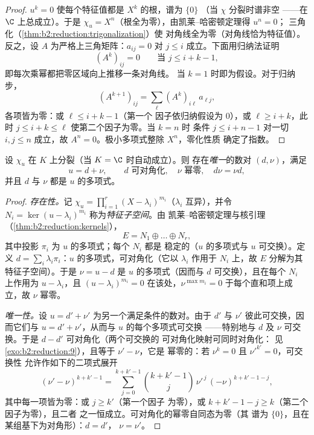 \begin{proof}
$u^k = 0$ 使每个特征值都是 $X^k$ 的根，谱为 $\{0\}$
（当 $\chi$ 分裂时谱非空 ——在 $\C$ 上总成立）。于是 $\chi_u =
X^n$（根全为零），由凯莱–哈密顿定理得 $u^n = 0$；
三角化（\cref{thm:b2:reduction:trigonalization}）使
对角线全为零（对角线恰为特征值）。
反之，设 $A$ 为严格上三角矩阵：$a_{ij} = 0$
对 $j \leq i$ 成立。下面用归纳法证明
\[
(A^k)_{ij} = 0 \qquad \text{当 } j \leq i + k - 1,
\]
即每次乘幂都把零区域向上推移一条对角线。
当 $k = 1$ 时即为假设。对于归纳步，
\[
(A^{k+1})_{ij} = \sum_{\ell} (A^k)_{i\ell}\,a_{\ell j} ,
\]
各项皆为零：或 $\ell \leq i + k - 1$（第一个
因子依归纳假设为 $0$），或 $\ell \geq i + k$，此时
$j \leq i + k \leq \ell$ 使第二个因子为零。当 $k = n$ 时
条件 $j \leq i + n - 1$ 对一切 $i, j \leq n$ 成立，故 $A^n =
0$。极小多项式整除 $X^n$，零化性质
确定了指数。
\end{proof}

\begin{theorem}[邓福德分解]\label{thm:b2:reduction:dunford}
设 $\chi_u$ 在 $K$ 上分裂（当 $K = \C$ 时自动成立）。则
存在\emph{唯一}的数对 $(d, \nu)$，满足
\[
u = d + \nu, \qquad d \text{ 可对角化}, \quad \nu
\text{ 幂零}, \quad d\nu = \nu d ,
\]
并且 $d$ 与 $\nu$ 都是
$u$ 的多项式。
\end{theorem}

\begin{proof}
\emph{存在性。}记 $\chi_u = \prod_{i=1}^{r} (X -
\lambda_i)^{m_i}$（$\lambda_i$ 互异），并令 $N_i = \ker(u -
\lambda_i)^{m_i}$ 称为\emph{特征子空间}。由
凯莱–哈密顿定理与核引理
（\cref{thm:b2:reduction:kernels}），
\[
E = N_1 \oplus \dots \oplus N_r ,
\]
其中投影 $\pi_i$ 为 $u$ 的多项式；每个 $N_i$ 都是
稳定的（$u$ 的多项式与 $u$ 可交换）。定义 $d = \sum_i \lambda_i
\pi_i$：$u$ 的多项式，可对角化（它以 $\lambda_i$
作用于 $N_i$ 上，故 $E$ 分解为其特征子空间）。于是 $\nu = u -
d$ 是 $u$ 的多项式（因而与 $d$ 可交换），且在每个
$N_i$ 上作用为 $u - \lambda_i$，且 $(u - \lambda_i)^{m_i} = 0$
在该处，$\nu^{\max m_i} = 0$ 于每个直和项上成立，故 $\nu$ 幂零。

\emph{唯一性。}设 $u = d' + \nu'$ 为另一个满足条件的数对。由于
$d'$ 与 $\nu'$ 彼此可交换，因而它们与 $u = d' +
\nu'$，从而与 $u$ 的每个多项式可交换 ——特别地与 $d$
及 $\nu$ 可交换。于是 $d - d'$ 可对角化（两个可交换的
可对角化映射可同时对角化：
见\cref{exo:b2:reduction:9}），且等于 $\nu' - \nu$，它是
幂零的：若 $\nu^k = 0$ 且 $\nu'^{k'} = 0$，可交换性
允许作如下的二项式展开
\[
(\nu' - \nu)^{k + k' - 1}
= \sum_{j=0}^{k+k'-1}\binom{k + k' - 1}{j}
\,\nu'^{\,j}\,(-\nu)^{k + k' - 1 - j} ,
\]
其中每一项皆为零：或 $j \geq k'$（第一个因子
为零），或 $k + k' - 1 - j \geq k$（第二个因子为零），且二者
之一恒成立。可对角化的幂零自同态为零（其
谱为 $\{0\}$，且在某组基下为对角形）：$d = d'$，
$\nu = \nu'$。
\end{proof}

